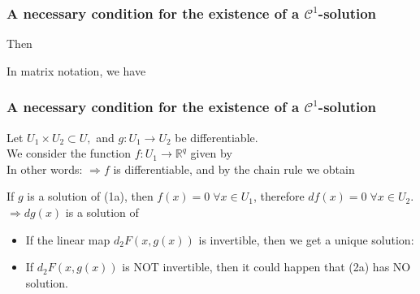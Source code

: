 \documentclass[10pt]{beamer}
\newcommand{\R}{\mathbb{R}}
\begin{document}
{\begin{frame} \frametitle{A necessary condition for the existence of a $\mathcal{C}^1$-solution}
Then
\begin{block}{} 
\vspace{1.5cm}
\end{block}{}
In matrix notation, we have\\
\vspace{3cm}

\end{frame}

\begin{frame} \frametitle{A necessary condition for the existence of a $\mathcal{C}^1$-solution}
Let  $U_1 \times U_2 \subset U,$ and $g:U_1 \rightarrow U_2$ be differentiable.\\
We consider the function $f:U_1 \rightarrow \R^q$ given by
$$\;$$
In other words: 
$\Rightarrow f$ is differentiable,  and by the chain rule we obtain
\begin{block}{} 
\vspace{0.8cm}
\end{block}{}
If $g$ is a solution of (1a), then $f(x)=0 \;\forall x\in U_1$, therefore $df(x)=0 \;\forall x \in U_2$.
$\Rightarrow dg(x)$ is a solution of
\begin{block}{} 
\vspace{0.5cm}
\end{block}{}
\begin{itemize}
\item If the linear map $d_2F(x,g(x))$ is invertible, then we get a unique solution:
\begin{block}{} 
\vspace{0.5cm}
\end{block}{}
\item If $d_2F(x,g(x))$ is NOT invertible, then it could happen that (2a) has NO solution.
\end{itemize}
\end{frame}


}
\end{document}
